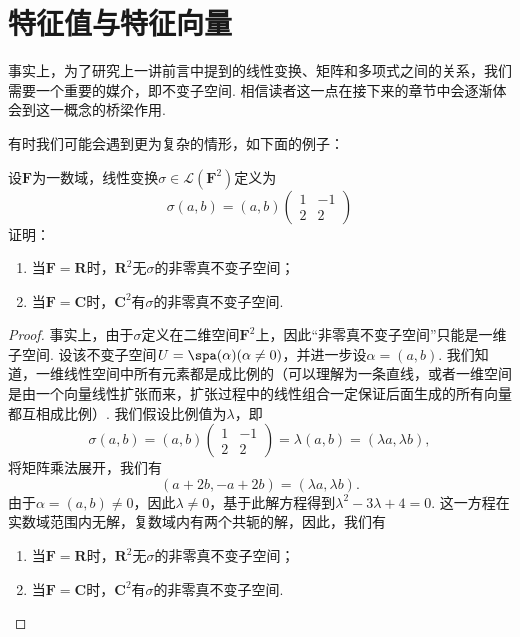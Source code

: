 \chapter{特征值与特征向量}

事实上，为了研究上一讲前言中提到的线性变换、矩阵和多项式之间的关系，我们需要一个重要的媒介，即不变子空间. 相信读者这一点在接下来的章节中会逐渐体会到这一概念的桥梁作用.

有时我们可能会遇到更为复杂的情形，如下面的例子：
\begin{example} \label{ex:18:不变子空间}
    设$\mathbf{F}$为一数域，线性变换$\sigma\in\mathcal{L}(\mathbf{F}^2)$定义为
    \[\sigma(a,b)=(a,b)\begin{pmatrix}
            1 & -1 \\ 2 & 2
        \end{pmatrix}\]
    证明：
    \begin{enumerate}
        \item 当$\mathbf{F}=\mathbf{R}$时，$\mathbf{R}^2$无$\sigma$的非零真不变子空间；

        \item 当$\mathbf{F}=\mathbf{C}$时，$\mathbf{C}^2$有$\sigma$的非零真不变子空间.
    \end{enumerate}
\end{example}

\begin{proof}
    事实上，由于$\sigma$定义在二维空间$\mathbf{F}^2$上，因此``非零真不变子空间''只能是一维子空间. 设该不变子空间$U=\spa(\alpha)(\alpha\neq 0)$，并进一步设$\alpha=(a,b)$. 我们知道，一维线性空间中所有元素都是成比例的（可以理解为一条直线，或者一维空间是由一个向量线性扩张而来，扩张过程中的线性组合一定保证后面生成的所有向量都互相成比例）. 我们假设比例值为$\lambda$，即
    \[\sigma(a,b)=(a,b)\begin{pmatrix}
            1 & -1 \\ 2 & 2
        \end{pmatrix}=\lambda(a,b)=(\lambda a,\lambda b),\]
    将矩阵乘法展开，我们有
    \[(a+2b,-a+2b)=(\lambda a,\lambda b).\]
    由于$\alpha=(a,b)\neq 0$，因此$\lambda\neq 0$，基于此解方程得到$\lambda^2-3\lambda+4=0$. 这一方程在实数域范围内无解，复数域内有两个共轭的解，因此，我们有
    \begin{enumerate}
        \item 当$\mathbf{F}=\mathbf{R}$时，$\mathbf{R}^2$无$\sigma$的非零真不变子空间；

        \item 当$\mathbf{F}=\mathbf{C}$时，$\mathbf{C}^2$有$\sigma$的非零真不变子空间.
    \end{enumerate}
\end{proof}

